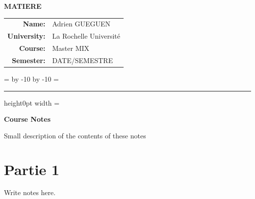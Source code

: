 \documentclass[11pt]{article}
\newcommand{\StudentName}{Adrien GUEGUEN}
\newcommand{\University}{La Rochelle Université}
\newcommand{\Course}{Master MIX}
\newcommand{\Subject}{MATIERE}
\newcommand{\Semester}{DATE/SEMESTRE}
\theoremstyle{definition}
\theoremstyle{remark}
\newenvironment{bigbox}
{
		\begingroup
		\boxfigwidth=\hsize
		\advance\boxfigwidth by -10\fboxrule
		\advance\boxfigwidth by -10\fboxsep
		\setbox4=\vbox\bgroup
		\hsize\boxfigwidth
		\hrule height0pt width\boxfigwidth
		\smallskip
		\linewidth=\boxfigwidth
}
{
		\smallskip
		\egroup
		\fbox{\box4}
		\endgroup
}
\begin{document}

\begin{center}

		{\Huge \textbf{\Subject}}

		\vspace{1cm}

		\begin{tabular}{rl}
				\textbf{Name:} & \StudentName\\[0.3cm]
				\textbf{University:} & \University\\[0.3cm]
				\textbf{Course:} & \Course\\[0.3cm]
				\textbf{Semester:} & \Semester
		\end{tabular}

\end{center}

\vspace{1cm}


\begin{bigbox}
		\centering
		\Large
		\textbf{Course Notes}

		\vspace{0.5cm}

		Small description of the contents of these notes

\end{bigbox}



\tableofcontents

\newpage


\section{Partie 1}

Write notes here.
\end{document}
